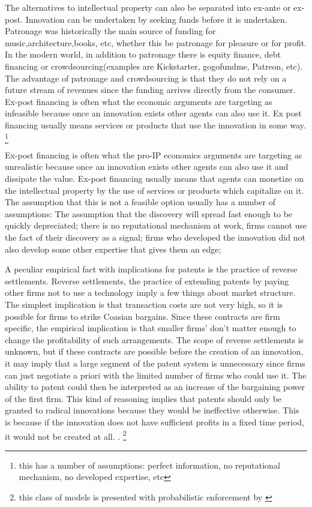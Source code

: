 \documentclass[12pt]{article}
\numberwithin{equation}{section}
\begin{document}
The alternatives to intellectual property can also be separated into ex-ante or ex-post. Innovation can be undertaken by seeking funds before it is undertaken. Patronage was historically the main source of funding for music,architecture,books, etc, whether this be patronage for pleasure or for profit. In the modern world, in addition to patronage there is equity finance, debt financing or crowdsourcing(examples are Kickstarter, gogofundme, Patreon, etc). The advantage of patronage and crowdsourcing is that they do not rely on a future stream of revenues since the funding arrives directly from the consumer. Ex-post financing is often what the economic arguments are targeting as infeasible because once an innovation exists other agents can also use it. Ex post financing usually means services or products that use the innovation in some way. \footnote{ this has a number of assumptions: perfect information, no reputational mechanism, no developed expertise, etc }

Ex-post financing is often what the pro-IP economics arguments are targeting as unrealistic because once an innovation exists other agents can also use it and dissipate the value. Ex-post financing usually means that agents can monetize on the intellectual property by the use of services or products which capitalize on it. The assumption that this is not a feasible option usually has a number of assumptions: The assumption that the discovery will spread fast enough to be quickly depreciated; there is no reputational mechanism at work, firms cannot use the fact of their discovery as a signal; firms who developed the innovation did not also develop some other expertise that gives them an edge;

A peculiar empirical fact with implications for patents is the practice of reverse settlements. Reverse settlements, the practice of extending patents by paying other firms not to use a technology imply a few things about market structure. The simplest implication is that transaction costs are not very high, so it is possible for firms to strike Coasian bargains. Since these contracts are firm specific, the empirical implication is that smaller firms' don't matter enough to change the profitability of such arrangements. The scope of reverse settlements is unknown, but if these contracts are possible before the creation of an innovation, it may imply that a large segment of the patent system is unnecessary since firms can just negotiate a priori with the limited number of firms who could use it. The ability to patent could then be interpreted as an increase of the bargaining power of the first firm\cite{green1995division}. This kind of reasoning implies that patents should only be granted to radical innovations because they would be ineffective otherwise. This is because if the innovation does not have sufficient profits in a fixed time period, it would not be created at all. \cite{o1998patentability}. \footnote{this class of models is presented with probabilistic enforcement by \cite{chou2007division} }
\end{document}
